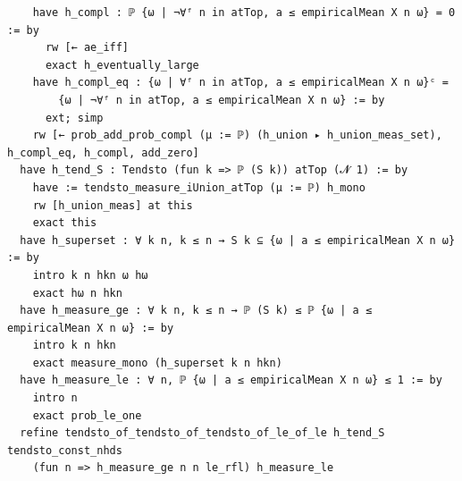 \newpage
\begin{lstlisting}
    have h_compl : ℙ {ω | ¬∀ᶠ n in atTop, a ≤ empiricalMean X n ω} = 0 := by
      rw [← ae_iff]
      exact h_eventually_large
    have h_compl_eq : {ω | ∀ᶠ n in atTop, a ≤ empiricalMean X n ω}ᶜ =
        {ω | ¬∀ᶠ n in atTop, a ≤ empiricalMean X n ω} := by
      ext; simp
    rw [← prob_add_prob_compl (μ := ℙ) (h_union ▸ h_union_meas_set), h_compl_eq, h_compl, add_zero]
  have h_tend_S : Tendsto (fun k => ℙ (S k)) atTop (𝓝 1) := by
    have := tendsto_measure_iUnion_atTop (μ := ℙ) h_mono
    rw [h_union_meas] at this
    exact this
  have h_superset : ∀ k n, k ≤ n → S k ⊆ {ω | a ≤ empiricalMean X n ω} := by
    intro k n hkn ω hω
    exact hω n hkn
  have h_measure_ge : ∀ k n, k ≤ n → ℙ (S k) ≤ ℙ {ω | a ≤ empiricalMean X n ω} := by
    intro k n hkn
    exact measure_mono (h_superset k n hkn)
  have h_measure_le : ∀ n, ℙ {ω | a ≤ empiricalMean X n ω} ≤ 1 := by
    intro n
    exact prob_le_one
  refine tendsto_of_tendsto_of_tendsto_of_le_of_le h_tend_S tendsto_const_nhds
    (fun n => h_measure_ge n n le_rfl) h_measure_le

\end{lstlisting}
\newpage
